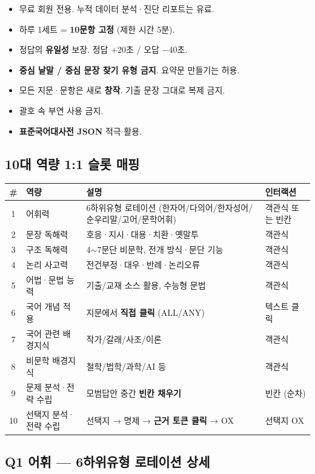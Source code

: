 \documentclass[11pt,a4paper]{article}
\begin{document}
\begin{itemize}
  \item 무료 회원 전용. 누적 데이터 분석·진단 리포트는 유료.
  \item 하루 1세트 = \textbf{10문항 고정} (제한 시간 5분).
  \item 정답의 \textbf{유일성} 보장. 정답 +20초 / 오답 $-$40초.
  \item \textbf{중심 낱말 / 중심 문장 찾기 유형 금지}. 요약문 만들기는 허용.
  \item 모든 지문·문항은 새로 \textbf{창작}. 기출 문장 그대로 복제 금지.
  \item 괄호 속 부연 사용 금지.
  \item \textbf{표준국어대사전 JSON} 적극 활용.
\end{itemize}

\subsection{10대 역량 1:1 슬롯 매핑}

\begin{tabularx}{\textwidth}{clXl}
\toprule
\rowcolor{rowbg}\textbf{\#} & \textbf{역량} & \textbf{설명} & \textbf{인터랙션} \\
\midrule
1 & 어휘력 & 6하위유형 로테이션 (한자어/다의어/한자성어/순우리말/고어/문학어휘) & 객관식 또는 빈칸 \\
2 & 문장 독해력 & 호응·지시·대용·치환·옛말투 & 객관식 \\
3 & 구조 독해력 & 4$\sim$7문단 비문학, 전개 방식·문단 기능 & 객관식 \\
4 & 논리 사고력 & 전건부정·대우·반례·논리오류 & 객관식 \\
5 & 어법·문법 능력 & 기출/교재 소스 활용, 수능형 문법 & 객관식 \\
6 & 국어 개념 적용 & 지문에서 \textbf{직접 클릭} (ALL/ANY) & 텍스트 클릭 \\
7 & 국어 관련 배경지식 & 작가/갈래/사조/이론 & 객관식 \\
8 & 비문학 배경지식 & 철학/법학/과학/AI 등 & 객관식 \\
9 & 문제 분석·전략 수립 & 모범답안 중간 \textbf{빈칸 채우기} & 빈칸 (순차) \\
10 & 선택지 분석·전략 수립 & 선택지 → 명제 → \textbf{근거 토큰 클릭} → OX & 선택지 OX \\
\bottomrule
\end{tabularx}

\subsection{Q1 어휘 — 6하위유형 로테이션 상세}
\end{document}
